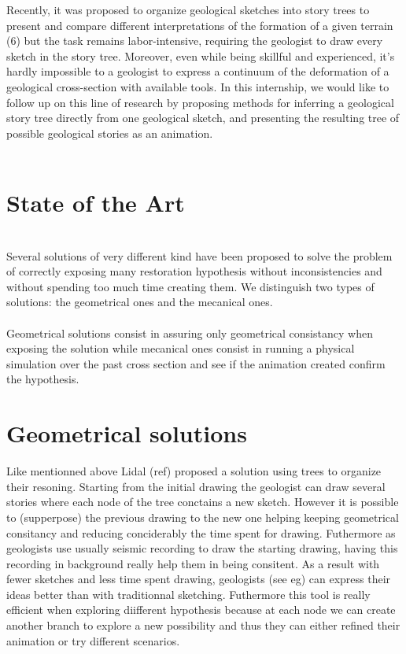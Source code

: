 \documentclass[12pt, a4paper]{memoir} %
\begin{document}
Recently, it was proposed to organize geological sketches into story trees to present and compare different interpretations of the formation of a given terrain (6) but the task remains labor-intensive, requiring the geologist to draw every sketch in the story tree. Moreover, even while being skillful and experienced, it’s hardly impossible to a geologist to express a continuum of the deformation of a geological cross-section with available tools.
In this internship, we would like to follow up on this line of research by proposing methods for inferring a geological story tree directly from one geological sketch, and presenting the resulting tree of possible geological stories as an animation.\\\\

\section{State of the Art}\\

Several solutions of very different kind have been proposed to solve the problem of correctly exposing many restoration hypothesis without inconsistencies and without spending too much time creating them. We distinguish two types of solutions: the geometrical ones and the mecanical ones.\\\\

Geometrical solutions consist in assuring only geometrical consistancy when exposing the solution while mecanical ones consist in running a physical simulation over the past cross section and see if the animation created confirm the hypothesis.

\section{Geometrical solutions}

Like mentionned above Lidal (ref) proposed a solution using trees to organize their resoning. Starting from the initial drawing the geologist can draw several stories where each node of the tree conctains a new sketch. However it is possible to (supperpose) the previous drawing to the new one helping keeping geometrical consitancy and reducing conciderably the time spent for drawing. Futhermore as geologists use usually seismic recording to draw the starting drawing, having this recording in background really help them in being consitent. As a result with fewer sketches and less time spent drawing, geologists  (see eg) can express their ideas better than with traditionnal sketching. Futhermore this tool is really efficient when exploring diifferent hypothesis because at each node we can create another branch to explore a new possibility and thus they can either refined their animation or try different scenarios. \\\\
\end{document}
